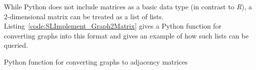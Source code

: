 %
While Python does not include matrices as a basic data type (in contrast to \emph{R}), a 2-dimensional matrix can be treated as a list of lists.
Listing~\ref{code:SLImplement_Graph2Matrix} gives a Python function for converting graphs into this format and gives an example of how such lists can be queried.
%
\begin{listing}[tbph]

\medskip
\begin{pythoncode}
    >>> graph = {
    ...     ['A', 'B', 'C'],
    ...     [
    ...         ('A', 'B', 'e'),
    ...         ('A', 'C', 'f'),
    ...         ('B', 'B', 'g'),
    ...         ('C', 'A', 'h'),
    ...         ('C', 'C', 'i')
    ...     ]
    ... ]
    >>> graph2matrix(graph)
    [['', 'e', 'f'], ['', 'g', ''], ['h', '', 'i']]
    >>> graph2matrix(graph)[graph[0].index('A')][graph[0].index('B')]
    'e'
\end{pythoncode}
\caption{Python function for converting graphs to adjacency matrices}
\label{code:SLImplement_Graph2Matrix}
\end{listing}

